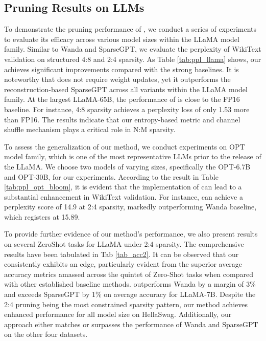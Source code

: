 \subsection{Pruning Results on LLMs}
To demonstrate the pruning performance of \name, we conduct a series of experiments to evaluate its efficacy across various model sizes within the LLaMA model family.
Similar to Wanda and SparseGPT, we evaluate the perplexity of WikiText validation on structured 4:8 and 2:4 sparsity. As Table \ref{tab:ppl_llama} shows, our \name achieves significant improvements compared with the strong baselines. It is noteworthy that \name does not require weight updates, yet it outperforms the reconstruction-based SparseGPT across all variants within the LLaMA model family. 
At the largest LLaMA-65B, the performance of \name is close to the FP16 baseline. For instance, 4:8 sparsity achieves a perplexity loss of only 1.53 more than FP16. The results indicate that our entropy-based metric and channel shuffle mechanism plays a critical role in N:M sparsity.

To assess the generalization of our method, we conduct experiments on OPT model family, which is one of the most representative LLMs prior to the release of the LLaMA. 
We choose two models of varying sizes, specifically the OPT-6.7B and OPT-30B, for our experiments. According to the result in Table \ref{tab:ppl_opt_bloom}, it is evident that the implementation of \name can lead to a substantial enhancement in WikiText validation. For instance, \name can  achieve a perplexity score of 14.9 at 2:4 sparsity, markedly outperforming Wanda baseline, which registers at 15.89. %

To provide further evidence of our method's performance, we also present results on several ZeroShot tasks for LLaMA under 2:4 sparsity. The comprehensive results have been tabulated in Tab \ref{tab_acc2}. 
It can be observed that our \name consistently exhibits an edge, particularly evident from the superior average accuracy metrics amassed across the quintet of Zero-Shot tasks when compared with other established baseline methods.
\name outperforms Wanda by a margin of 3\% and exceeds SparseGPT by 1\% on average accuracy for LLaMA-7B.
Despite the 2:4 pruning being the most constrained sparsity pattern, our method achieves enhanced performance for all model size on HellaSwag. Additionally, our approach either matches or surpasses the performance of Wanda and SparseGPT on the other four datasets.

